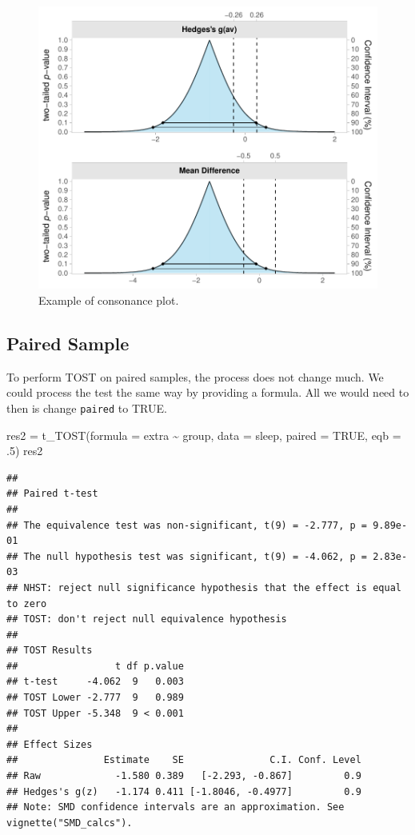 \documentclass[]{interact}
\theoremstyle{plain}%
\theoremstyle{definition}
\theoremstyle{remark}
\newenvironment{Shaded}{\begin{snugshade}}{\end{snugshade}}
\newcommand{\AttributeTok}[1]{\textcolor[rgb]{0.77,0.63,0.00}{#1}}
\newcommand{\ConstantTok}[1]{\textcolor[rgb]{0.00,0.00,0.00}{#1}}
\newcommand{\DecValTok}[1]{\textcolor[rgb]{0.00,0.00,0.81}{#1}}
\newcommand{\FunctionTok}[1]{\textcolor[rgb]{0.00,0.00,0.00}{#1}}
\newcommand{\NormalTok}[1]{#1}
\newcommand{\OtherTok}[1]{\textcolor[rgb]{0.56,0.35,0.01}{#1}}
\newcommand{\SpecialCharTok}[1]{\textcolor[rgb]{0.00,0.00,0.00}{#1}}
\begin{document}
\begin{figure}
\centering
\includegraphics{Avocado_Update_files/figure-latex/conplot-1.pdf}
\caption{Example of consonance plot.}
\end{figure}

\newpage

\hypertarget{paired-sample}{%
\subsection{Paired Sample}\label{paired-sample}}

To perform TOST on paired samples, the process does not change much. We
could process the test the same way by providing a formula. All we would
need to then is change \texttt{paired} to TRUE.

\begin{Shaded}
\begin{Highlighting}[]
\NormalTok{res2 }\OtherTok{=} \FunctionTok{t\_TOST}\NormalTok{(}\AttributeTok{formula =}\NormalTok{ extra }\SpecialCharTok{\textasciitilde{}}\NormalTok{ group,}
              \AttributeTok{data =}\NormalTok{ sleep,}
              \AttributeTok{paired =} \ConstantTok{TRUE}\NormalTok{,}
              \AttributeTok{eqb =}\NormalTok{ .}\DecValTok{5}\NormalTok{)}
\NormalTok{res2}
\end{Highlighting}
\end{Shaded}

\begin{verbatim}
## 
## Paired t-test
## 
## The equivalence test was non-significant, t(9) = -2.777, p = 9.89e-01
## The null hypothesis test was significant, t(9) = -4.062, p = 2.83e-03
## NHST: reject null significance hypothesis that the effect is equal to zero 
## TOST: don't reject null equivalence hypothesis
## 
## TOST Results 
##                 t df p.value
## t-test     -4.062  9   0.003
## TOST Lower -2.777  9   0.989
## TOST Upper -5.348  9 < 0.001
## 
## Effect Sizes 
##               Estimate    SE               C.I. Conf. Level
## Raw             -1.580 0.389   [-2.293, -0.867]         0.9
## Hedges's g(z)   -1.174 0.411 [-1.8046, -0.4977]         0.9
## Note: SMD confidence intervals are an approximation. See vignette("SMD_calcs").
\end{verbatim}
\end{document}
